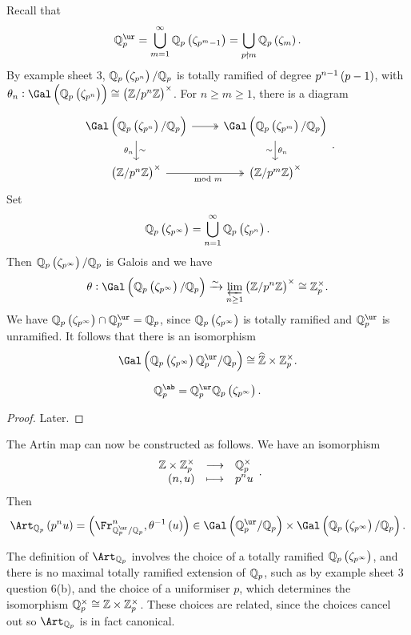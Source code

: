Recall that
$$ \QQ_p^{\ur} = \bigcup_{m = 1}^\infty \QQ_p\br{\zeta_{p^m - 1}} = \bigcup_{p \nmid m} \QQ_p\br{\zeta_m}. $$
By example sheet $ 3 $, $ \QQ_p\br{\zeta_{p^n}} / \QQ_p $ is totally ramified of degree $ p^{n - 1}\br{p - 1} $, with $ \theta_n : \Gal\br{\QQ_p\br{\zeta_{p^n}}} \cong \br{\ZZ / p^n\ZZ}^\times $. For $ n \ge m \ge 1 $, there is a diagram
$$
\begin{tikzcd}
\Gal\br{\QQ_p\br{\zeta_{p^n}} / \QQ_p} \arrow[twoheadrightarrow]{r} \arrow{d}{\sim}[swap]{\theta_n} & \Gal\br{\QQ_p\br{\zeta_{p^m}} / \QQ_p} \arrow{d}{\theta_n}[swap]{\sim} \\
\br{\ZZ / p^n\ZZ}^\times \arrow[twoheadrightarrow]{r}[swap]{\mod m} & \br{\ZZ / p^m\ZZ}^\times
\end{tikzcd}.
$$
Set
$$ \QQ_p\br{\zeta_{p^\infty}} = \bigcup_{n = 1}^\infty \QQ_p\br{\zeta_{p^n}}. $$
Then $ \QQ_p\br{\zeta_{p^\infty}} / \QQ_p $ is Galois and we have
$$ \theta : \Gal\br{\QQ_p\br{\zeta_{p^\infty}} / \QQ_p} \xrightarrow{\sim} \varprojlim_{n \ge 1} \br{\ZZ / p^n\ZZ}^\times \cong \ZZ_p^\times. $$
We have $ \QQ_p\br{\zeta_{p^\infty}} \cap \QQ_p^{\ur} = \QQ_p $, since $ \QQ_p\br{\zeta_{p^\infty}} $ is totally ramified and $ \QQ_p^{\ur} $ is unramified. It follows that there is an isomorphism
$$ \Gal\br{\QQ_p\br{\zeta_{p^\infty}}\QQ_p^{\ur} / \QQ_p} \cong \widehat{\ZZ} \times \ZZ_p^\times. $$

\begin{theorem}
\label{thm:19.5}
$$ \QQ_p^{\ab} = \QQ_p^{\ur}\QQ_p\br{\zeta_{p^\infty}}. $$
\end{theorem}

\begin{proof}
Later.
\end{proof}

\pagebreak

The Artin map can now be constructed as follows. We have an isomorphism
$$ \function{\ZZ \times \ZZ_p^\times}{\QQ_p^\times}{\br{n, u}}{p^nu}. $$
Then
$$ \Art_{\QQ_p}\br{p^nu} = \br{\Fr_{\QQ_p^{\ur} / \QQ_p}^n, \theta^{-1}\br{u}} \in \Gal\br{\QQ_p^{\ur} / \QQ_p} \times \Gal\br{\QQ_p\br{\zeta_{p^\infty}} / \QQ_p}. $$

\begin{remark*}
The definition of $ \Art_{\QQ_p} $ involves the choice of a totally ramified $ \QQ_p\br{\zeta_{p^\infty}} $, and there is no maximal totally ramified extension of $ \mathbb{Q}_p $, such as by example sheet $ 3 $ question $ 6 $(b), and the choice of a uniformiser $ p $, which determines the isomorphism $ \mathbb{Q}_p^\times \cong \mathbb{Z} \times \mathbb{Z}_p^\times $. These choices are related, since the choices cancel out so $ \Art_{\QQ_p} $ is in fact canonical.
\end{remark*}

